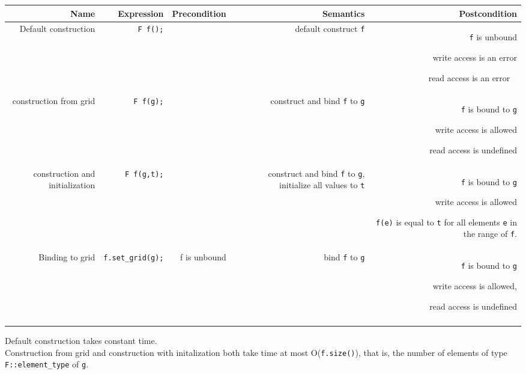 \begin{tabularx}{15cm}{RRRRR} 
  \hline    
  \bf  Name     &
  \bf  Expression &
  \bf  Precondition&
  \bf  Semantics &
  \bf  Postcondition
  \\ 
  \hline
  Default construction & 
  {\tt F f();} &
  ~ &
  default construct {\tt f} &
  {\tt f} is unbound
  \par write access is an error
  \par read  access is an error
  ~
  \\ 
  construction from grid & 
  {\tt F f(g);} &
  ~ &
  construct and bind {\tt f}  to {\tt g} &
  {\tt f} is bound to {\tt g} 
  \par write access is allowed 
  \par read access is undefined
  \\ 
  construction and initialization & 
  {\tt F f(g,t);} &
  ~ &
  construct and bind {\tt f}  to {\tt g}, 
  initialize all values to {\tt t} &
  {\tt f} is bound to {\tt g} 
  \par write access is allowed 
  \par {\tt f(e)} is equal to {\tt t} for all elements {\tt e}
  in the range of {\tt f}.
  \\ 
  Binding to grid &
  {\tt f.set\_grid(g);} &
  f is unbound &
  bind {\tt f}  to {\tt g} &
  {\tt f} is bound to {\tt g} 
  \par write access is allowed, 
  \par read access is undefined
  \\ 
  \hline
  \\
\end{tabularx}

Default construction takes constant time.
\\
Construction from grid and construction with initalization both
take time at most O({\tt f.size()}), that is, the number of 
elements of type {\tt F::element\_type} of {\tt g}.
 

 ~
\W\\

\W{}
    

\W{}

 
 ~
 ~
 ~

  

